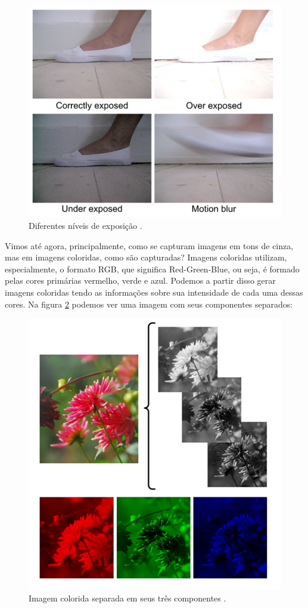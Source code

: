 \documentclass[
  brazilian,
]{book}
\begin{document}
\begin{figure}

{\centering \includegraphics[width=0.6\linewidth]{imagens/02-formacao/exposicao} 

}

\caption{Diferentes níveis de exposição \autocite[p.17]{moeslund2012}.}\label{fig:exposicao}
\end{figure}

Vimos até agora, principalmente, como se capturam imagens em tons de cinza, mas em imagens coloridas, como são capturadas?
Imagens coloridas utilizam, especialmente, o formato RGB, que significa Red-Green-Blue, ou seja, é formado pelas cores primárias vermelho, verde e azul. Podemos a partir disso gerar imagens coloridas tendo as informações sobre sua intensidade de cada uma dessas cores. Na figura \ref{fig:componentes} podemos ver uma imagem com seus componentes separados:



\begin{figure}

{\centering \includegraphics[width=0.65\linewidth]{imagens/02-formacao/componentes} 

}

\caption{Imagem colorida separada em seus três componentes \autocite[p.28]{moeslund2012}.}\label{fig:componentes}
\end{figure}
\end{document}
